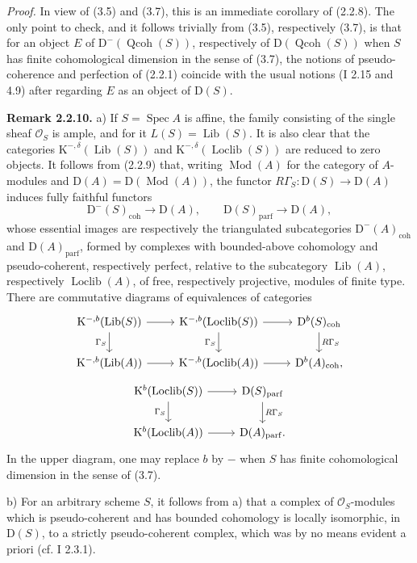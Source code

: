 \documentclass[11pt]{article}
\providecommand{\Mod}{\operatorname{Mod}}
\providecommand{\Lib}{\operatorname{Lib}}
\providecommand{\Loclib}{\operatorname{Loclib}}
\providecommand{\Qcoh}{\operatorname{Qcoh}}
\providecommand{\coh}{\operatorname{coh}}
\providecommand{\parf}{\operatorname{parf}}
\begin{document}
\emph{Proof.} In view of (3.5) and (3.7), this is an immediate corollary of (2.2.8). The only point to check, and it follows trivially from (3.5), respectively (3.7), is that for an object $E$ of $\mathrm D^{-}(\Qcoh(S))$, respectively of $\mathrm D(\Qcoh(S))$ when $S$ has finite cohomological dimension in the sense of (3.7), the notions of pseudo-coherence and perfection of (2.2.1) coincide with the usual notions (I 2.15 and 4.9) after regarding $E$ as an object of $\mathrm D(S)$.

\textbf{Remark 2.2.10.} a) If $S=\operatorname{Spec}A$ is affine, the family consisting of the single sheaf $\mathcal O_S$ is ample, and for it $L(S)=\Lib(S)$. It is also clear that the categories $\mathrm K^{-,\delta}(\Lib(S))$ and $\mathrm K^{-,\delta}(\Loclib(S))$ are reduced to zero objects. It follows from (2.2.9) that, writing $\Mod(A)$ for the category of $A$-modules and $\mathrm D(A)=\mathrm D(\Mod(A))$, the functor $R\Gamma_S:\mathrm D(S)\to\mathrm D(A)$ induces fully faithful functors
\[
\mathrm D^{-}(S)_{\coh}\longrightarrow \mathrm D(A),
\qquad
\mathrm D(S)_{\parf}\longrightarrow \mathrm D(A),
\]
whose essential images are respectively the triangulated subcategories $\mathrm D^{-}(A)_{\coh}$ and $\mathrm D(A)_{\parf}$, formed by complexes with bounded-above cohomology and pseudo-coherent, respectively perfect, relative to the subcategory $\Lib(A)$, respectively $\Loclib(A)$, of free, respectively projective, modules of finite type. There are commutative diagrams of equivalences of categories
\[
\begin{tikzcd}
\mathrm K^{-,b}(\Lib(S)) \arrow[r] \arrow[d,"\Gamma_S"'] &
\mathrm K^{-,b}(\Loclib(S)) \arrow[r] \arrow[d,"\Gamma_S"'] &
\mathrm D^b(S)_{\coh} \arrow[d,"R\Gamma_S"] \\
\mathrm K^{-,b}(\Lib(A)) \arrow[r] &
\mathrm K^{-,b}(\Loclib(A)) \arrow[r] &
\mathrm D^b(A)_{\coh},
\end{tikzcd}
\]
\[
\begin{tikzcd}
\mathrm K^b(\Loclib(S)) \arrow[r] \arrow[d,"\Gamma_S"'] &
\mathrm D(S)_{\parf} \arrow[d,"R\Gamma_S"] \\
\mathrm K^b(\Loclib(A)) \arrow[r] &
\mathrm D(A)_{\parf}.
\end{tikzcd}
\]
In the upper diagram, one may replace $b$ by $-$ when $S$ has finite cohomological dimension in the sense of (3.7).

b) For an arbitrary scheme $S$, it follows from a) that a complex of $\mathcal O_S$-modules which is pseudo-coherent and has bounded cohomology is locally isomorphic, in $\mathrm D(S)$, to a strictly pseudo-coherent complex, which was by no means evident a priori (cf. I 2.3.1).
\end{document}
